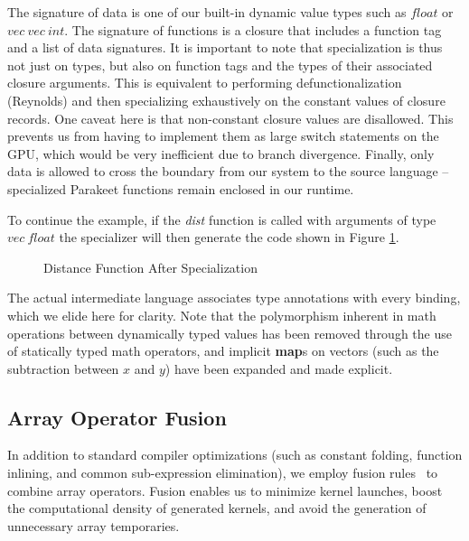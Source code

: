 \documentclass[preprint]{sigplanconf}
\begin{document}
The signature of data is one of our built-in dynamic value types such as $float$ or $vec~vec~int$.  The signature of functions is a closure that includes a function tag and a list of data signatures.  It is important to note that specialization is thus not just on types, but also on function tags and the types of their associated closure arguments. This is equivalent to performing defunctionalization (Reynolds) and
then specializing exhaustively on the constant values of closure records. One caveat here is that non-constant closure values are disallowed.  This prevents us from having to implement them as large switch statements on the GPU, which would be very inefficient due to branch divergence.  Finally, only data is
allowed to cross the boundary from our system to the source language -- specialized Parakeet functions remain enclosed in our runtime.

To continue the example, if the \textit{dist} function is called with arguments of type $vec~ float$ the specializer will then generate the code shown in Figure \ref{SpecDist}.

\begin{figure}[h!]
\caption{Distance Function After Specialization}
\label{SpecDist}
\end{figure}

The actual intermediate language associates type annotations with every binding, which we elide here for clarity. Note that the polymorphism inherent in math operations between dynamically typed values has been removed through the use of statically typed math operators, and implicit \textbf{map}s on vectors (such as the subtraction between $x$ and $y$) have been expanded and made explicit.

\subsection{Array Operator Fusion}
In addition to standard compiler optimizations (such as constant folding, function inlining, and common sub-expression elimination), we employ fusion rules~\cite{Jones01} to combine array operators. Fusion enables us to minimize kernel launches, boost the computational density of generated kernels, and avoid the generation of unnecessary array temporaries.
\end{document}
